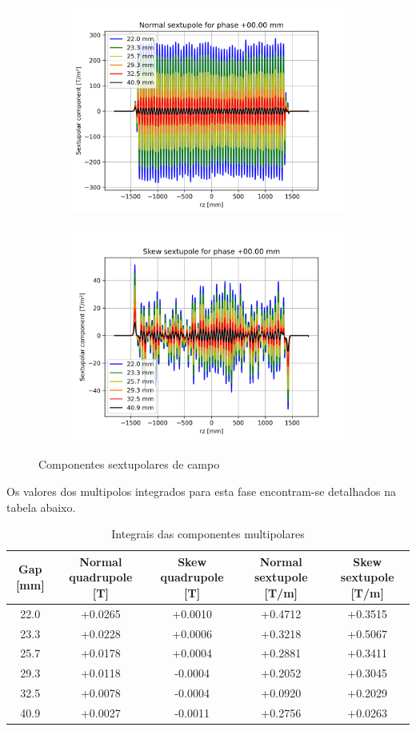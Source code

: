 \documentclass[a4paper,12pt]{article}
\begin{document}
\begin{figure}[H]
\begin{subfigure}{0.5\textwidth}
\includegraphics[width=0.9\linewidth, height=7cm]{figs/phase0 Normal sextupole.png} 
\label{fig:subim10s}
\end{subfigure}
\begin{subfigure}{0.5\textwidth}
\includegraphics[width=0.9\linewidth, height=7cm]{figs/phase0 Skew sextupole.png}
\label{fig:subim20s}
\end{subfigure}
\caption{Componentes sextupolares de campo}
\label{fig:sext0}
\end{figure}

Os valores dos multipolos integrados para esta fase encontram-se detalhados na tabela abaixo.

\begin{table}[H]\footnotesize
\caption{Integrais das componentes multipolares}
\centering
\begin{tabular}{|c|c|c|c|c|}
\hline
   Gap [mm] &   Normal quadrupole [T] &   Skew quadrupole [T] &   Normal sextupole [T/m] &   Skew sextupole [T/m] \\
\hline
22.0 & +0.0265 & +0.0010 & +0.4712 & +0.3515 \\
23.3 & +0.0228 & +0.0006 & +0.3218 & +0.5067 \\
25.7 & +0.0178 & +0.0004 & +0.2881 & +0.3411 \\
29.3 & +0.0118 & -0.0004 & +0.2052 & +0.3045 \\
32.5 & +0.0078 & -0.0004 & +0.0920 & +0.2029 \\
40.9 & +0.0027 & -0.0011 & +0.2756 & +0.0263 \\
\hline
\end{tabular}
\end{table}
\end{document}

